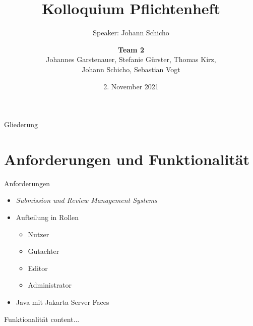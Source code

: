 \documentclass{beamer}
\title{Kolloquium Pflichtenheft}
\subtitle{Speaker: Johann Schicho}
\date{\small 2. November 2021}
\author{\textbf{Team 2} \\ \small {Johannes Garstenauer, Stefanie Gürster, Thomas Kirz,\\ Johann Schicho, Sebastian Vogt} \normalsize}
\begin{document}
	\begin{frame}
		\titlepage
	\end{frame}

	\begin{frame}{Gliederung}
		\tableofcontents
	\end{frame}

\section{Anforderungen und Funktionalität}

\begin{frame}{Anforderungen}
	\begin{itemize}
		\item \emph{Submission und Review Management Systems}
		\pause %

		\item Aufteilung in Rollen
		\begin{itemize}
			\item Nutzer
			\item Gutachter
			\item Editor
			\item Administrator
		\end{itemize}
		\pause

		\item Java mit Jakarta Server Faces

	\end{itemize}
\end{frame}

\begin{frame}{Funktionalität}
	content...
\end{frame}
\end{document}
